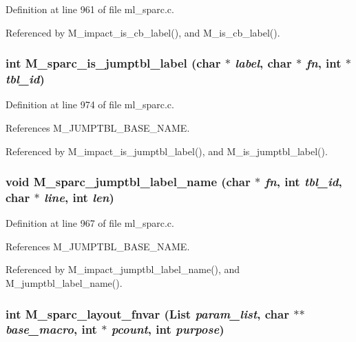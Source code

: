 Definition at line 961 of file ml\_\-sparc.c.

Referenced by M\_\-impact\_\-is\_\-cb\_\-label(), and M\_\-is\_\-cb\_\-label().
\subsubsection{\setlength{\rightskip}{0pt plus 5cm}int M\_\-sparc\_\-is\_\-jumptbl\_\-label (char $\ast$ {\em label}, char $\ast$ {\em fn}, int $\ast$ {\em tbl\_\-id})}\label{m__sparc_8h_f542dde0a56d19c388a6e4562242364d}




Definition at line 974 of file ml\_\-sparc.c.

References M\_\-JUMPTBL\_\-BASE\_\-NAME.

Referenced by M\_\-impact\_\-is\_\-jumptbl\_\-label(), and M\_\-is\_\-jumptbl\_\-label().
\subsubsection{\setlength{\rightskip}{0pt plus 5cm}void M\_\-sparc\_\-jumptbl\_\-label\_\-name (char $\ast$ {\em fn}, int {\em tbl\_\-id}, char $\ast$ {\em line}, int {\em len})}\label{m__sparc_8h_a8bb4786c5a281d43408eeca343f3280}




Definition at line 967 of file ml\_\-sparc.c.

References M\_\-JUMPTBL\_\-BASE\_\-NAME.

Referenced by M\_\-impact\_\-jumptbl\_\-label\_\-name(), and M\_\-jumptbl\_\-label\_\-name().
\subsubsection{\setlength{\rightskip}{0pt plus 5cm}int M\_\-sparc\_\-layout\_\-fnvar (\bf{List} {\em param\_\-list}, char $\ast$$\ast$ {\em base\_\-macro}, int $\ast$ {\em pcount}, int {\em purpose})}\label{m__sparc_8h_e27149bd41448ad4d7b1f6d8d16e84a5}




